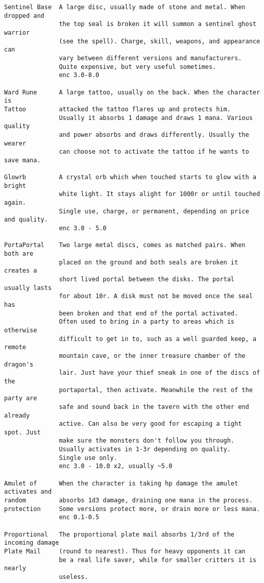 \begin{verbatim}
Sentinel Base  A large disc, usually made of stone and metal. When dropped and
               the top seal is broken it will summon a sentinel ghost warrior
               (see the spell). Charge, skill, weapons, and appearance can
               vary between different versions and manufacturers.
               Quite expensive, but very useful sometimes.
               enc 3.0-8.0

Ward Rune      A large tattoo, usually on the back. When the character is
Tattoo         attacked the tattoo flares up and protects him.
               Usually it absorbs 1 damage and draws 1 mana. Various quality
               and power absorbs and draws differently. Usually the wearer
               can choose not to activate the tattoo if he wants to save mana.

Glowrb         A crystal orb which when touched starts to glow with a bright
               white light. It stays alight for 1000r or until touched again.
               Single use, charge, or permanent, depending on price and quality.
               enc 3.0 - 5.0

PortaPortal    Two large metal discs, comes as matched pairs. When both are
               placed on the ground and both seals are broken it creates a
               short lived portal between the disks. The portal usually lasts
               for about 10r. A disk must not be moved once the seal has
               been broken and that end of the portal activated.
               Often used to bring in a party to areas which is otherwise
               difficult to get in to, such as a well guarded keep, a remote
               mountain cave, or the inner treasure chamber of the dragon's
               lair. Just have your thief sneak in one of the discs of the
               portaportal, then activate. Meanwhile the rest of the party are
               safe and sound back in the tavern with the other end already
               active. Can also be very good for escaping a tight spot. Just
               make sure the monsters don't follow you through.
               Usually activates in 1-3r depending on quality.
               Single use only.
               enc 3.0 - 10.0 x2, usually ~5.0

Amulet of      When the character is taking hp damage the amulet activates and
random         absorbs 1d3 damage, draining one mana in the process.
protection     Some versions protect more, or drain more or less mana.
               enc 0.1-0.5

Proportional   The proportional plate mail absorbs 1/3rd of the incoming damage
Plate Mail     (round to nearest). Thus for heavy opponents it can
               be a real life saver, while for smaller critters it is nearly
               useless.


\end{verbatim}
